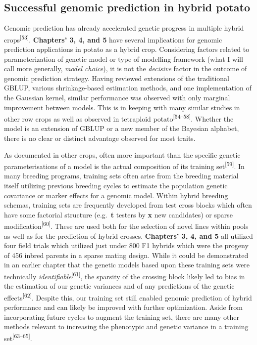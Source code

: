 \subsection{Successful genomic prediction in hybrid
potato}\label{successful-genomic-prediction-in-hybrid-potato}

Genomic prediction has already accelerated genetic progress in multiple
hybrid crops\textsuperscript{{[}53{]}}. \textbf{Chapters' 3, 4, and 5}
have several implications for genomic prediction applications in potato
as a hybrid crop. Considering factors related to parameterization of
genetic model or type of modelling framework (what I will call more
generally, \emph{model choice}), it is not the \emph{decisive} factor in
the outcome of genomic prediction strategy. Having reviewed extensions
of the traditional GBLUP, various shrinkage-based estimation methods,
and one implementation of the Gaussian kernel, similar performance was
observed with only marginal improvement between models. This is in
keeping with many similar studies in other row crops as well as observed
in tetraploid potato\textsuperscript{{[}54--58{]}}. Whether the model is
an extension of GBLUP or a new member of the Bayesian alphabet, there is
no clear or distinct advantage observed for most traits.

As documented in other crops, often more important than the specific
genetic parameterisations of a model is the actual composition of its
training set\textsuperscript{{[}59{]}}. In many breeding programs,
training sets often arise from the breeding material itself utilizing
previous breeding cycles to estimate the population genetic covariance
or marker effects for a genomic model. Within hybrid breeding schemas,
training sets are frequently developed from test cross blocks which
often have some factorial structure (e.g.~\textbf{t} testers by
\textbf{x} new candidates) or sparse
modification\textsuperscript{{[}60{]}}. These are used both for the
selection of novel lines within pools as well as for the prediction of
hybrid crosses. \textbf{Chapters' 3, 4, and 5} all utilized four field
trials which utilized just under 800 F1 hybrids which were the progeny
of 456 inbred parents in a sparse mating design. While it could be
demonstrated in an earlier chapter that the genetic models based upon
these training sets were technically
\emph{identifiable}\textsuperscript{{[}61{]}}, the sparsity of the
crossing block likely led to bias in the estimation of our genetic
variances and of any predictions of the genetic
effects\textsuperscript{{[}62{]}}. Despite this, our training set still
enabled genomic prediction of hybrid performance and can likely be
improved with further optimization. Aside from incorporating future
cycles to augment the training set, there are many other methods
relevant to increasing the phenotypic and genetic variance in a training
set\textsuperscript{{[}63--65{]}}.

